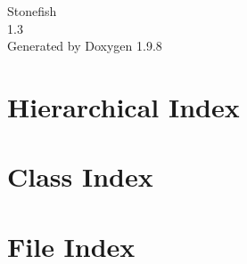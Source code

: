 \documentclass[twoside]{book}
\newcommand{\+}{\discretionary{\mbox{\scriptsize$\hookleftarrow$}}{}{}}
\newcommand{\clearemptydoublepage}{%
    \newpage{\pagestyle{empty}\cleardoublepage}%
  }
\begin{document}
  \raggedbottom
    \hypersetup{pageanchor=false,
                bookmarksnumbered=true,
                pdfencoding=unicode
               }
  \begin{titlepage}
  \vspace*{7cm}
  \begin{center}%
  {\Large Stonefish}\\
  [1ex]\large 1.\+3 \\
  \vspace*{1cm}
  {\large Generated by Doxygen 1.9.8}\\
  \end{center}
  \end{titlepage}
  \clearemptydoublepage
  \tableofcontents
  \clearemptydoublepage
  \hypersetup{pageanchor=true}
\chapter{Hierarchical Index}

\chapter{Class Index}

\chapter{File Index}

\end{document}
